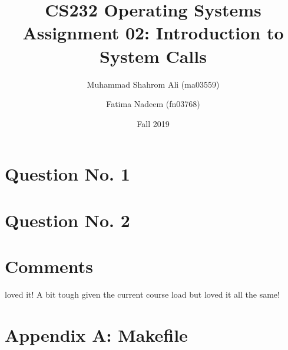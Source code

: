 \documentclass[a4paper]{article}
\begin{document}
\title{CS232 Operating Systems \\ Assignment 02: Introduction to System Calls}
\author{Muhammad Shahrom Ali (ma03559) \and Fatima Nadeem (fn03768)}
\date{Fall 2019}
\maketitle


\section {Question No. 1}



\newpage

\section {Question No. 2}



\section {Comments}

loved it! A bit tough given the current course load but loved it all the same!

\newpage

\section{Appendix A: Makefile}


\end{document}
